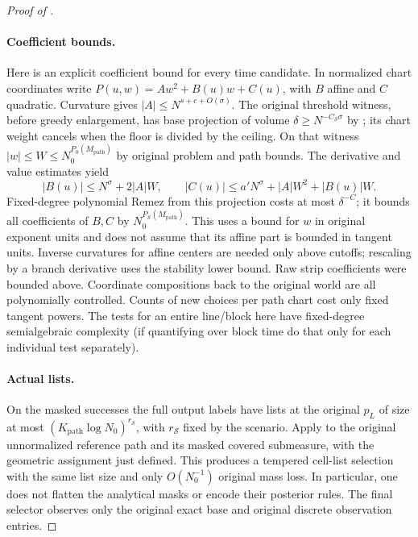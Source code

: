 \begin{proof}[Proof of ]
\paragraph{Coefficient bounds.} Here is an explicit coefficient bound for every time candidate.
In normalized chart coordinates write
\(P(u,w)=A w^2+B(u)w+C(u)\), with \(B\) affine and \(C\) quadratic.
Curvature gives \(|A|\le N^{s+c+O(\sigma)}\).  The original threshold
witness, before greedy enlargement, has base projection of volume
\(\delta\ge N^{-C_{\mathcal S}\sigma}\) by
; its chart weight cancels when the floor is
divided by the ceiling.  On that witness
\(|w|\le W\le N_0^{P_0(M_{\mathrm{path}})}\) by original problem and
path bounds.  The derivative and value estimates yield
\begin{equation}
|B(u)|\le N^\sigma+2|A|W,\qquad
 |C(u)|\le a'N^\sigma+|A|W^2+|B(u)|W .
 \label{a03:coefficient-recovery}
\end{equation}
Fixed-degree polynomial Remez from this projection costs at most
\(\delta^{-C}\); it bounds all coefficients of \(B,C\) by
\(N_0^{P_{\mathcal S}(M_{\mathrm{path}})}\).
This uses a bound for \(w\) in original exponent units and does not
assume that its affine part is bounded in tangent units. Inverse curvatures for affine centers are needed only above cutoffs; rescaling by a branch derivative uses the stability lower bound. Raw strip coefficients were bounded above. Coordinate compositions back to the original world are all polynomially controlled. Counts of new choices per path chart cost only fixed tangent powers. The tests for an entire line/block here have fixed-degree semialgebraic complexity (if quantifying over block time do that only for each individual test separately).
\paragraph{Actual lists.} On the masked successes the full output labels have lists at the
original \(p_L\) of size at most
\((K_{\mathrm{path}}\log N_0)^{r_{\mathcal S}}\), with
\(r_{\mathcal S}\) fixed by the scenario.  Apply
 to the original unnormalized reference path
and its masked covered submeasure, with the geometric assignment just
defined.  This produces a tempered cell-list selection with the same
list size and only \(O(N_0^{-1})\) original mass loss.  In particular,
one does not flatten the analytical masks or encode their posterior
rules.  The final selector observes only the original exact base and
original discrete observation entries.

\end{proof}
